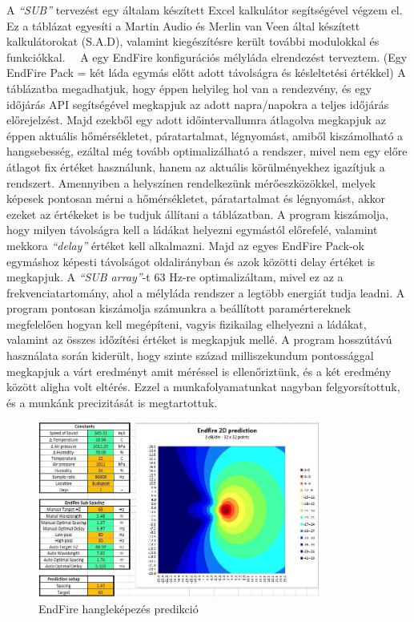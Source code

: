 A \textit{``SUB''} tervezést egy általam készített Excel kalkulátor
segítségével végzem el. Ez a táblázat egyesíti a Martin Audio és Merlin van Veen által
készített kalkulátorokat (S.A.D), valamint kiegészítésre került további modulokkal és funkciókkal.~\cite{MERLINVANVEEN}~\cite{MARTINSUBCALCULATOR}
A egy EndFire konfigurációs mélyláda elrendezést terveztem. 
(Egy EndFire Pack = két láda egymás előtt adott távolságra és késleltetési értékkel) 
A táblázatba megadhatjuk, hogy éppen helyileg hol
van a rendezvény, és egy időjárás API segítségével megkapjuk az adott napra/napokra a
teljes időjárás előrejelzést. Majd ezekből egy adott időintervallumra átlagolva
megkapjuk az éppen aktuális hőmérsékletet, páratartalmat, légnyomást, amiből kiszámolható
a hangsebesség, ezáltal még tovább optimalizálható a rendszer, mivel nem egy előre átlagot fix értéket
használunk, hanem az aktuális körülményekhez igazítjuk a rendszert.
Amennyiben a helyszínen rendelkezünk mérőeszközökkel, melyek képesek pontosan mérni a hőmérsékletet,
páratartalmat és légnyomást, akkor ezeket az értékeket is be tudjuk állítani a táblázatban.
A program kiszámolja, hogy milyen távolságra kell a ládákat helyezni egymástól előrefelé,
valamint mekkora \textit{``delay''} értéket kell alkalmazni. 
Majd az egyes EndFire Pack-ok egymáshoz képesti távolságot oldalirányban és azok
közötti delay értéket is megkapjuk. A \textit{``SUB array''}-t 63 Hz-re optimalizáltam, mivel
ez az a frekvenciatartomány, ahol a mélyláda rendszer a legtöbb energiát tudja leadni.
A program pontosan kiszámolja számunkra a beállított paramértereknek megfelelően hogyan kell megépíteni, 
vagyis fizikailag elhelyezni a ládákat, valamint az összes időzítési értéket is megkapjuk mellé.
A program hosszútávú használata során kiderült, hogy szinte század milliszekundum pontossággal
megkapjuk a várt eredményt amit méréssel is ellenőriztünk, és a két eredmény között aligha volt eltérés.
Ezzel a munkafolyamatunkat nagyban felgyorsítottuk, és a munkánk precizitását is megtartottuk.
\begin{figure}[H]
	\centering
	\includegraphics[width=350px, keepaspectratio]{figures/endfire_excel.jpg}
	\caption{EndFire hangleképezés predikció}\label{fig:endfire_excel}
\end{figure}
